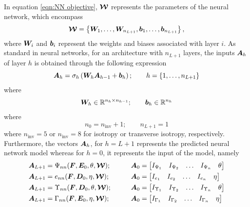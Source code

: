 In equation \eqref{eqn:NN objective}, $\boldsymbol{\mathcal{W}}$ represents the parameters of the neural network, which encompass
%
\begin{equation}
\boldsymbol{\mathcal{W}}=\left\{\boldsymbol{W}_1,\dots,\boldsymbol{W}_{n_{L+1}},\boldsymbol{b}_1,\dots,\boldsymbol{b}_{n_{L+1}}\right\},
\end{equation}
%
where $\boldsymbol{W}_i$ and $\boldsymbol{b}_i$ represent the weights and biases associated with layer $i$. As standard in neural networks, for an architecture with $n_{L+1}$ layers, the inputs $\boldsymbol{A}_h$ of layer $h$ is obtained through the following expression
%
\begin{equation}
\boldsymbol{A}_h   =  \sigma_h\left(\boldsymbol{W}_h\boldsymbol{A}_{h-1}+\boldsymbol{b}_h\right);\qquad h=\{1,\dots,n_{L+1}\}
\end{equation}
%
where 
%
\begin{equation}
\begin{aligned}
\boldsymbol{W}_h  \in \mathbb{R}^{n_{h}\times n_{h-1}};\qquad 	\boldsymbol{b}_h  \in \mathbb{R}^{n_{h}}
\end{aligned}
\end{equation}
%
where
%
\begin{equation}
n_0  =  n_{\text{inv}}+1;\qquad n_{L+1}=1
\end{equation}
%
where $n_{\text{inv}}=5$ or $n_{\text{inv}}=8$ for isotropy or transverse isotropy, respectively. Furthermore, the vectors $\boldsymbol{A}_h$, for $h=L+1$ represents the predicted neural network model whereas for $h=0$, it represents the input of the model, namely 
%
\begin{equation}
\begin{aligned}
\vect{A}_{L+1}&  =  \Psi_{nn}(\vect{F},\vect{E}_0, \theta,\vect{\mathcal{W}});&\qquad \vect{A}_0&  =  \begin{bmatrix}
I_{\Psi_1}  &  I_{\Psi_2} & \dots & I_{\Psi_n} & \theta
\end{bmatrix}\\
%
\vect{A}_{L+1}&  =  e_{nn}(\vect{F},\vect{D}_0, \eta,\vect{\mathcal{W}});&\qquad \vect{A}_0 & =  \begin{bmatrix}
I_{e_1}  &  I_{e_2} & \dots & I_{e_n} & \eta
\end{bmatrix}\\
%
\vect{A}_{L+1}&  = \Upsilon_{nn}(\vect{F},\vect{D}_0, \theta,\vect{\mathcal{W}});&\qquad\vect{A}_0 & =  \begin{bmatrix}I_{\Upsilon_1}  &  I_{\Upsilon_2} & \dots & I_{\Upsilon_n} & \theta
\end{bmatrix}\\
%
\vect{A}_{L+1}&  = \Gamma_{nn}(\vect{F},\vect{E}_0, \eta,\vect{\mathcal{W}});&\qquad\vect{A}_0 & =  \begin{bmatrix}I_{\Gamma_1}  &  I_{\Gamma_2} & \dots & I_{\Gamma_n} & \eta
\end{bmatrix}
\end{aligned}
\end{equation}

